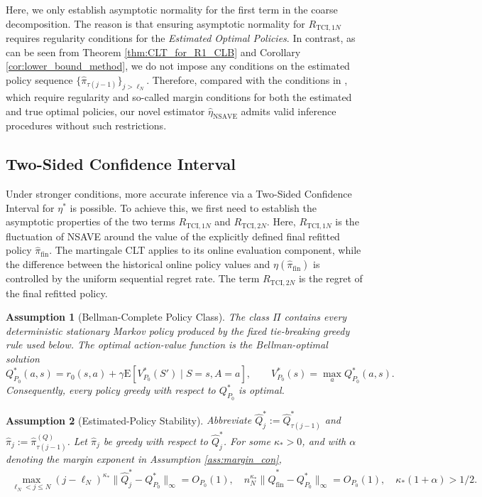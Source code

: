 \documentclass[12pt]{article}
\newtheorem{assumption}{Assumption}
\theoremstyle{remark}\newtheorem{remark}[theorem]{Remark}\theoremstyle{plain}
\newcommand{\E}{\mathrm{E}}
\begin{document}
Here, we only establish asymptotic normality for the first term in the coarse decomposition. The reason is that ensuring asymptotic normality for $R_{\text{TCI}, 1N}$ requires regularity conditions for the \textit{Estimated Optimal Policies}. In contrast, as can be seen from Theorem \ref{thm:CLT_for_R1_CLB} and Corollary \ref{cor:lower_bound_method}, we do not impose any conditions on the estimated policy sequence $\{ \widehat{\pi}_{\tau(j - 1)} \}_{j > \ell_N}$. Therefore, compared with the conditions in \cite{shi2022statistical}, which require regularity and so-called margin conditions for both the estimated and true optimal policies,
our novel estimator $\widehat{\eta}_{\text{NSAVE}}$ admits valid inference procedures without such restrictions.

\subsection{Two-Sided Confidence Interval}\label{sec:2_sided_CI}

Under stronger conditions, more accurate inference via a Two-Sided Confidence Interval for $\eta^*$ is possible. To achieve this, we first need to establish the asymptotic properties of the two terms $R_{\text{TCI}, 1N}$ and $R_{\text{TCI}, 2N}$.
Here, $R_{\text{TCI},1N}$ is the fluctuation of NSAVE around
the value of the explicitly defined final refitted policy
$\widehat\pi_{\mathrm{fin}}$.  The martingale CLT applies to its
online evaluation component, while the difference between the
historical online policy values and
$\eta(\widehat\pi_{\mathrm{fin}})$ is controlled by the uniform
sequential regret rate.  The term $R_{\text{TCI},2N}$ is the regret
of the final refitted policy.

\begin{assumption}[Bellman-Complete Policy Class]
\label{ass:bellman_complete}
    The class $\Pi$ contains every deterministic stationary Markov
    policy produced by the fixed tie-breaking greedy rule used below.
    The optimal action-value function is the Bellman-optimal solution
    \[
        Q_{P_0}^*(a,s)
        =r_0(s,a)+\gamma
        \E\!\left[V_{P_0}^*(S')\mid S=s,A=a\right],
        \qquad
        V_{P_0}^*(s)=\max_aQ_{P_0}^*(a,s).
    \]
    Consequently, every policy greedy with respect to
    $Q_{P_0}^*$ is optimal.
\end{assumption}

\begin{assumption}[Estimated-Policy Stability]\label{ass:est_pol}
    Abbreviate
    $\widehat Q_j^*:=\widehat Q_{\tau(j-1)}^*$ and
    $\widehat\pi_j:=\widehat\pi_{\tau(j-1)}^{(Q)}$.
    Let $\widehat\pi_j$ be greedy with respect to
    $\widehat Q_j^*$.
    For some $\kappa_*>0$, and with $\alpha$ denoting the margin
    exponent in Assumption \ref{ass:margin_con},
    \[
        \begin{aligned}
        \max_{\ell_N<j\leq N}
        (j-\ell_N)^{\kappa_*}
        \|\widehat Q_j^*-Q_{P_0}^*\|_\infty=O_{P_0}(1), \quad
        n_N^{\kappa_*}
        \|\widehat Q_{\mathrm{fin}}^*-Q_{P_0}^*\|_\infty
        =O_{P_0}(1),
        \quad \kappa_*(1+\alpha)>1/2.
        \end{aligned}
    \]
\end{assumption}
\end{document}
